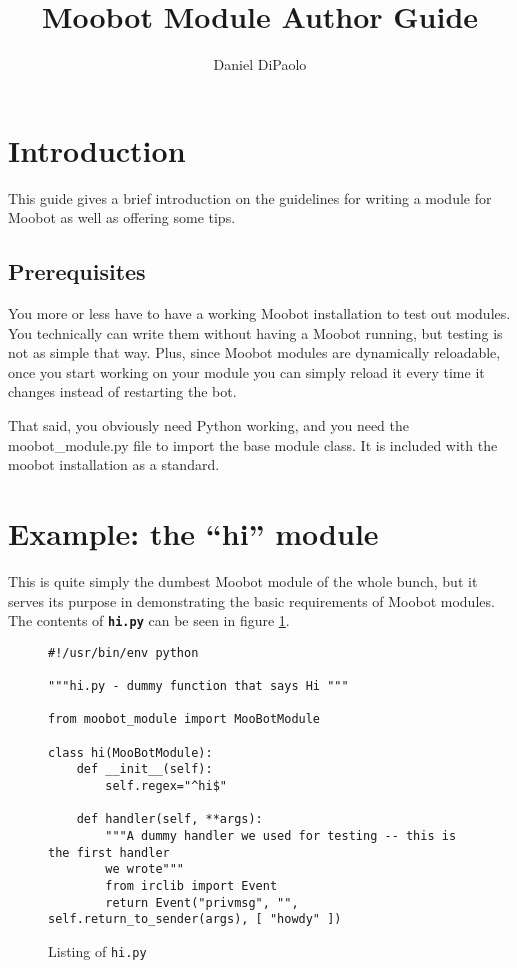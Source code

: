 \documentclass{article}[12pt]
\title{Moobot Module Author Guide}
\author{Daniel DiPaolo}
\begin{document}
\maketitle
\newpage

\tableofcontents
\newpage

\section{Introduction}
This guide gives a brief introduction on the guidelines for writing a module
for Moobot as well as offering some tips.
\subsection{Prerequisites}
You more or less have to have a working Moobot installation to test out
modules.  You technically can write them without having a Moobot running, but
testing is not as simple that way.  Plus, since Moobot modules are dynamically
reloadable, once you start working on your module you can simply reload it
every time it changes instead of restarting the bot.

That said, you obviously need Python working, and you need the
moobot\_module.py file to import the base module class.  It is included with
the moobot installation as a standard.

\section{Example: the ``hi'' module}
This is quite simply the dumbest Moobot module of the whole bunch, but it
serves its purpose in demonstrating the basic requirements of Moobot modules.
The contents of \texttt{\textbf{hi.py}} can be seen in figure
\ref{fig:hi-listing}.

\begin{figure}[hp]
	\begin{center}
	\begin{verbatim}
#!/usr/bin/env python

"""hi.py - dummy function that says Hi """

from moobot_module import MooBotModule

class hi(MooBotModule):
	def __init__(self):
		self.regex="^hi$"

	def handler(self, **args):
		"""A dummy handler we used for testing -- this is the first handler
		we wrote"""
		from irclib import Event
		return Event("privmsg", "", self.return_to_sender(args), [ "howdy" ])
	\end{verbatim}
	\end{center}
	\caption{Listing of \texttt{hi.py}}
	\label{fig:hi-listing}
\end{figure}
\end{document}
